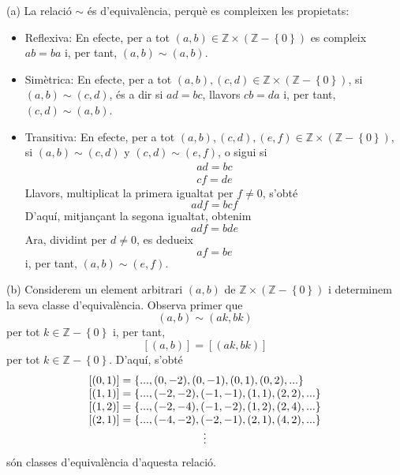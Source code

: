 \begin{solucio}
(a) La relació $\sim $ és d'equivalència, perquè es
compleixen les propietats:

\begin{itemize}
\item Reflexiva: En efecte, per a tot $(a,b)\in \mathbb{Z}\times \left(
\mathbb{Z}-\left\{ 0\right\} \right) $ es compleix $ab=ba$ i, per tant, $%
(a,b)\sim (a,b)$.

\item Simètrica: En efecte, per a tot $(a,b),(c,d)\in \mathbb{Z}\times
\left( \mathbb{Z}-\left\{ 0\right\} \right) $, si $(a,b)\sim (c,d)$, és
a dir si $ad=bc$, llavors $cb=da$ i, per tant, $(c,d)\sim (a,b)$.

\item Transitiva: En efecte, per a tot $(a,b),(c,d),(e,f)\in \mathbb{Z}%
\times \left( \mathbb{Z}-\left\{ 0\right\} \right) $, si $(a,b)\sim (c,d)$ y
$(c,d)\sim (e,f)$, o sigui si%
\begin{equation*}
\begin{array}{c}
ad=bc \\
cf=de%
\end{array}%
\end{equation*}%
Llavors, multiplicat la primera igualtat per $f\neq 0$, s'obté%
\begin{equation*}
adf=bcf
\end{equation*}%
D'aquí, mitjançant la segona igualtat, obtenim%
\begin{equation*}
adf=bde
\end{equation*}%
Ara, dividint per $d\neq 0$, es dedueix%
\begin{equation*}
af=be
\end{equation*}%
i, per tant, $(a,b)\sim (e,f)$.
\end{itemize}

(b) Considerem un element arbitrari $(a,b)$ de $\mathbb{Z}\times \left(
\mathbb{Z}-\left\{ 0\right\} \right) $ i determinem la seva classe d'equivalència. Observa primer que%
\begin{equation*}
(a,b)\sim (ak,bk)
\end{equation*}%
per tot $k\in \mathbb{Z}-\left\{ 0\right\} $ i, per tant,%
\begin{equation*}
\left[ (a,b)\right] =\left[ (ak,bk)\right]
\end{equation*}%
per tot $k\in \mathbb{Z}-\left\{ 0\right\} $. D'aquí, s'obté%
\begin{equation*}
\begin{array}{l}
\left[ (0,1)\right] =\left\{ ...,(0,-2),(0,-1),(0,1),(0,2),...\right\} \\
\left[ (1,1)\right] =\left\{ ...,(-2,-2),(-1,-1),(1,1),(2,2),...\right\} \\
\left[ (1,2)\right] =\left\{ ...,(-2,-4),(-1,-2),(1,2),(2,4),...\right\} \\
\left[ (2,1)\right] =\left\{ ...,(-4,-2),(-2,-1),(2,1),(4,2),...\right\} \\
\multicolumn{1}{c}{\vdots}%
\end{array}%
\end{equation*}%
són classes d'equivalència d'aquesta relació.


\end{solucio}

